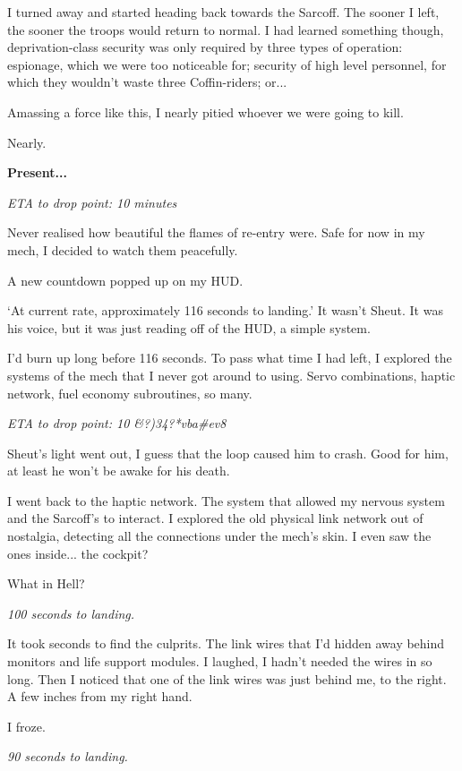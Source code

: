 I turned away and started heading back towards the Sarcoff. The sooner I left, the sooner the troops would return to normal. I had learned something though, deprivation-class security was only required by three types of operation: espionage, which we were too noticeable for; security of high level personnel, for which they wouldn't waste three Coffin-riders; or...

Amassing a force like this, I nearly pitied whoever we were going to kill.

Nearly.

\vspace{5mm}

{\bf {\large Present...}}

{\it ETA to drop point: 10 minutes}

Never realised how beautiful the flames of re-entry were. Safe for now in my mech, I decided to watch them peacefully.

A new countdown popped up on my HUD. 

`At current rate, approximately 116 seconds to landing.' It wasn't Sheut. It was his voice, but it was just reading off of the HUD, a simple system.

I'd burn up long before 116 seconds. To pass what time I had left, I explored the systems of the mech that I never got around to using. Servo combinations, haptic network, fuel economy subroutines, so many.

{\it ETA to drop point: 10 \&?)34?*vba\#ev8}

Sheut's light went out, I guess that the loop caused him to crash. Good for him, at least he won't be awake for his death.

I went back to the haptic network. The system that allowed my nervous system and the Sarcoff's to interact. I explored the old physical link network out of nostalgia, detecting all the connections under the mech's skin. I even saw the ones inside... the cockpit?

What in Hell?

{\it 100 seconds to landing.}

It took seconds to find the culprits. The link wires that I'd hidden away behind monitors and life support modules. I laughed, I hadn't needed the wires in so long. Then I noticed that one of the link wires was just behind me, to the right. A few inches from my right hand.

I froze.

{\it 90 seconds to landing.}


